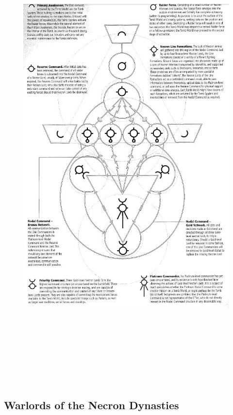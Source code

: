 {\begin{figure}
	\centering
	\includegraphics[width=500pt, height=700pt]{nodal.png}
\end{figure}
}

\newpage
\subsection{Warlords of the Necron Dynasties}

